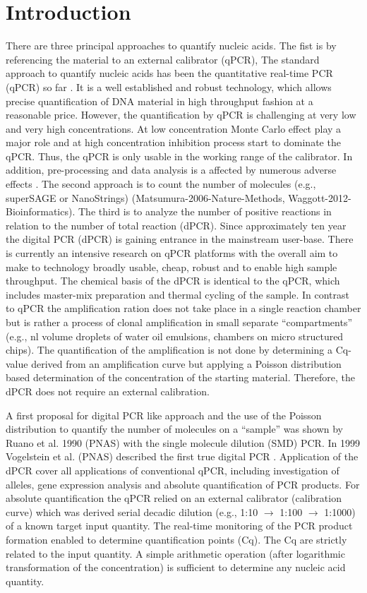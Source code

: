 \documentclass{bioinfo}
\begin{document}
\section{Introduction}
There are three principal approaches to quantify nucleic acids. The fist is by 
referencing the material to an external calibrator (qPCR), The standard approach 
to quantify nucleic acids has been the quantitative real-time PCR (qPCR) so far \cite{pabinger_survey_2014}. 
It is a well established and robust technology, which allows precise 
quantification of DNA material in high throughput fashion at a reasonable price. 
However, the quantification by qPCR is challenging at very low and very high 
concentrations. At low concentration Monte Carlo effect play a major role and at 
high concentration inhibition process start to dominate the qPCR. Thus, the qPCR 
is only usable in the working range of the calibrator. In addition, pre-processing and data analysis is a affected by numerous adverse effects \cite{spiess_impact_2015}. The second 
approach is to count the number of molecules (e.g., superSAGE or NanoStrings) 
(Matsumura-2006-Nature-Methods, Waggott-2012-Bioinformatics). The third is to 
analyze the number of positive reactions in relation to the number of total 
reaction (dPCR). Since approximately ten year the digital PCR (dPCR) is gaining 
entrance in the mainstream user-base. There is currently an intensive research 
on qPCR platforms with the overall aim to make to technology broadly usable, 
cheap, robust and to enable high sample throughput. The chemical basis of the 
dPCR is identical to the qPCR, which includes master-mix preparation and thermal 
cycling of the sample. In contrast to qPCR the amplification ration does not 
take place in a single reaction chamber but is rather a process of clonal 
amplification in small separate ``compartments'' (e.g., nl volume droplets of 
water oil emulsions, chambers on micro structured chips). The quantification of 
the amplification is not done by determining a Cq-value derived from an 
amplification curve but applying a Poisson distribution based determination of 
the concentration of the starting material. Therefore, the dPCR does not require 
an external calibration.

A first proposal for digital PCR like approach and the use of the Poisson 
distribution to quantify the number of molecules on a ``sample'' was shown by 
Ruano et al. 1990 (PNAS) with the single molecule dilution (SMD) PCR. In 1999 
Vogelstein et al. (PNAS) described the first true digital PCR \cite{morley_digital_2014}. Application of 
the dPCR cover all applications of conventional qPCR, including investigation of 
alleles, gene expression analysis and absolute quantification of PCR products. 
For absolute quantification the qPCR relied on an external calibrator 
(calibration curve) which was derived serial decadic dilution (e.g., 1:10 $\rightarrow$ 
1:100 $\rightarrow$ 1:1000) of a known target input quantity. The real-time monitoring of 
the PCR product formation enabled to determine quantification points (Cq). The 
Cq are strictly related to the input quantity. A simple arithmetic operation 
(after logarithmic transformation of the concentration) is sufficient to 
determine any nucleic acid quantity.
\end{document}
